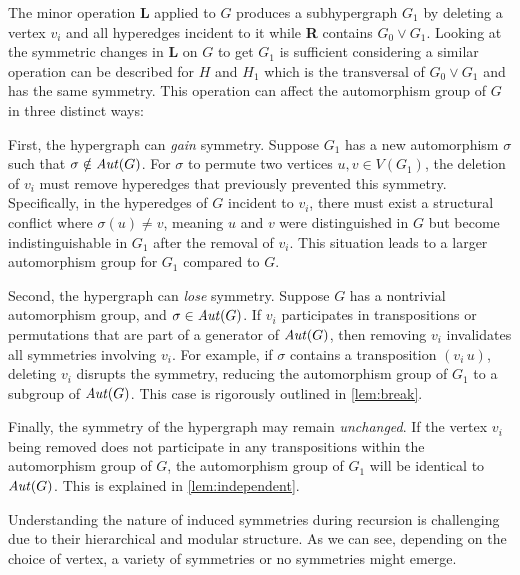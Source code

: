 The minor operation \textbf{L} applied to $G$ produces a subhypergraph $G_1$ by deleting a vertex $v_i$ and all hyperedges incident to it while \textbf{R} contains $G_0\vee G_1$. Looking at the symmetric changes in \textbf{L} on $G$ to get $G_1$ is sufficient considering a similar operation can be described for $H$ and $H_1$ which is the transversal of $G_0\vee G_1$ and has the same symmetry. This operation can affect the automorphism group of $G$ in three distinct ways:

First, the hypergraph can \emph{gain} symmetry. Suppose $G_1$ has a new automorphism $\sigma$ such that $\sigma\notin\mathit{Aut}(G)$. For $\sigma$ to permute two vertices $u,v\in V(G_1)$, the deletion of $v_i$ must remove hyperedges that previously prevented this symmetry. Specifically, in the hyperedges of $G$ incident to $v_i$, there must exist a structural conflict where $\sigma(u)\neq v$, meaning $u$ and $v$ were distinguished in $G$ but become indistinguishable in $G_1$ after the removal of $v_i$. This situation leads to a larger automorphism group for $G_1$ compared to $G$.

Second, the hypergraph can \emph{lose} symmetry. Suppose $G$ has a nontrivial automorphism group, and $\sigma\in\mathit{Aut}(G)$. If $v_i$ participates in transpositions or permutations that are part of a generator of $\mathit{Aut}(G)$, then removing $v_i$ invalidates all symmetries involving $v_i$. For example, if $\sigma$ contains a transposition $(v_i\,u)$, deleting $v_i$ disrupts the symmetry, reducing the automorphism group of $G_1$ to a subgroup of $\mathit{Aut}(G)$. This case is rigorously outlined in \ref{lem:break}.

Finally, the symmetry of the hypergraph may remain \emph{unchanged}. If the vertex $v_i$ being removed does not participate in any transpositions within the automorphism group of $G$, the automorphism group of $G_1$ will be identical to $\mathit{Aut}(G)$. This is explained in \ref{lem:independent}.

Understanding the nature of induced symmetries during \FKA{} recursion is challenging due to their hierarchical and modular structure. As we can see, depending on the choice of vertex, a variety of symmetries or no symmetries might emerge.
